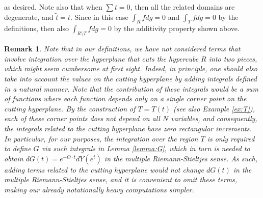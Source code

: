 \documentclass[english, a4paper, 12pt,reqno]{amsart}
\newtheorem{rem}[defi]{Remark}
\begin{document}
as desired. Note also that when $\sum t = 0$, then all the related domains are degenerate, and $\tilde{t} = t$. Since in this case $\int_R fdg =0$ and $\int_T fdg =0$ by the definitions, then also $\int_{R\setminus T} fdg =0$ by the additivity property shown above. 
\begin{rem}
Note that in our definitions, we have not considered terms that involve integration over the hyperplane that cuts the hypercube $R$ into two pieces, which might seem cumbersome at first sight. Indeed, in principle, one should also take into account the values on the cutting hyperplane by adding integrals defined in a natural manner. Note that the contribution of these integrals would be a sum of functions where each function depends only on a single corner point on the cutting hyperplane. By the construction of $T=T(t)$ (see also Example \ref{ex:T}), each of these corner points does not depend on all $N$ variables, and consequently, the integrals related to the cutting hyperplane have zero rectangular increments. In particular, for our purposes, the integration over the region $T$ is only required to define $G$ via such integrals in Lemma \ref{lemma:G}, which in turn is needed to obtain $dG(t) = e^{-\Theta\cdot t}dY(e^t)$ in the multiple Riemann-Stieltjes sense. As such, adding terms related to the cutting hyperplane would not change $dG(t)$ in the multiple Riemann-Stieltjes sense, and it is convenient to omit these terms, making our already notationally heavy computations simpler. 
\end{rem}
\end{document}
